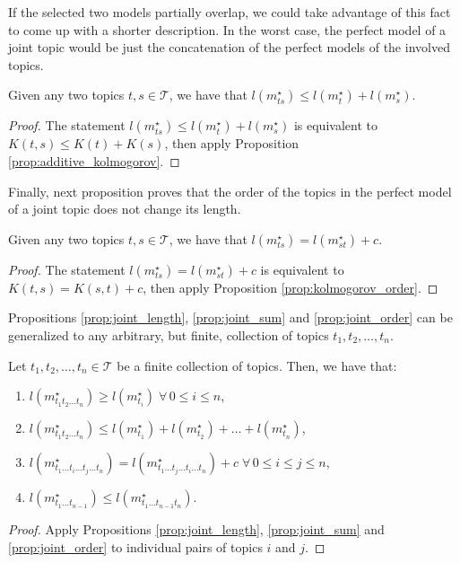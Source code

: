If the selected two models partially overlap, we could take advantage of this fact to come up with a shorter description. In the worst case, the perfect model of a joint topic would be just the concatenation of the perfect models of the involved topics.

\begin{proposition}
\label{prop:joint_sum}
Given any two topics $t,s \in \mathcal{T}$, we have that $l \left( m_{ts}^{\star} \right) \leq l \left( m_{t}^{\star} \right) + l \left( m_{s}^{\star} \right)$.
\end{proposition}
\begin{proof}
The statement $l \left( m_{ts}^{\star} \right) \leq l \left( m_{t}^{\star} \right) + l \left( m_{s}^{\star} \right)$ is equivalent to $K(t,s) \leq K(t) + K(s)$, then apply Proposition \ref{prop:additive_kolmogorov}.
\end{proof}

Finally, next proposition proves that the order of the topics in the perfect model of a joint topic does not change its length.

\begin{proposition}
\label{prop:joint_order}
Given any two topics $t,s \in \mathcal{T}$, we have that $l \left( m_{ts}^{\star} \right) = l \left( m_{st}^{\star} \right) + c$.
\end{proposition}
\begin{proof}
The statement $l \left( m_{ts}^{\star} \right) = l \left( m_{st}^{\star} \right) + c$ is equivalent to $K(t,s) = K(s,t) + c$, then apply Proposition \ref{prop:kolmogorov_order}.
\end{proof}

Propositions \ref{prop:joint_length}, \ref{prop:joint_sum} and \ref{prop:joint_order} can be generalized to any arbitrary, but finite, collection of topics $t_1, t_2, \ldots, t_n$.

\begin{proposition}
\label{prop:joint_multiple_topics}
Let $t_1, t_2, \ldots, t_n \in \mathcal{T}$ be a finite collection of topics. Then, we have that:

\renewcommand{\theenumi}{\roman{enumi}}
\begin{enumerate}
\item $l(m_{t_1 t_2 \ldots t_n}^\star) \geq l(m_ {t_i}^\star) \; \forall \, 0 \leq i \leq n$,
\item $l(m_{t_1 t_2 \ldots t_n}^\star) \leq l(m_ {t_1}^\star) + l(m_ {t_2}^\star) + \ldots + l(m_ {t_n}^\star)$,
\item $l(m_{t_1 \ldots t_i \ldots t_j \ldots t_n}^\star) = l(m_{t_1 \ldots t_j \ldots t_i \ldots t_n}^\star) + c \; \forall \, 0 \leq i \leq j \leq n$,
\item $l(m_{t_1 \ldots t_{n-1}}^\star) \leq l(m_{t_1 \ldots t_{n-1} t_n}^\star)$.
\end{enumerate}
\end{proposition}
\begin{proof}
Apply Propositions \ref{prop:joint_length}, \ref{prop:joint_sum} and \ref{prop:joint_order} to individual pairs of topics $i$ and $j$.
\end{proof}

